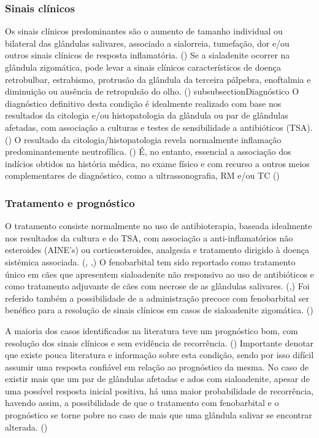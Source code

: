 \subsubsection{Sinais clínicos}
Os sinais clínicos predominantes são o aumento de tamanho individual ou bilateral das glândulas salivares, associado a sialorreia, tumefação, dor e/ou outros sinais clínicos de resposta inflamatória. (\cite{McGill2009}) Se a sialadenite ocorrer na glândula zigomática, pode levar a sinais clínicos característicos de doença retrobulbar, estrabismo, protrusão da glândula da terceira pálpebra, enoftalmia e diminuição ou ausência de retropulsão do olho. (\cite{11cases})
subsubsection{Diagnóstico}
O diagnóstico definitivo desta condição é idealmente realizado com base nos resultados da citologia e/ou histopatologia da glândula ou par de glândulas afetadas, com associação a culturas e testes de sensibilidade a antibióticos (TSA). (\cite{Enache2025}) O resultado da citologia/histopatologia   revela normalmente inflamação predominantemente neutrofílica. (\cite{Enache2025}) É, no entanto, essencial a associação dos indícios obtidos na história médica, no exame físico e com recurso a outros meios complementares de diagnóstico, como a ultrassonografia, RM e/ou TC  (\cite{Enache2025})

\subsubsection{Tratamento e prognóstico}

O tratamento consiste normalmente no uso de antibioterapia, baseada idealmente nos resultados da cultura e do TSA, com associação a anti-inflamatórios não esteroides (AINE’s) ou corticosteroides, analgesia e tratamento dirigido à doença sistémica associada. (\cite{Park2022}, \cite{Enache2025},\cite{sialadenite}) O fenobarbital tem sido reportado como tratamento único em cães que apresentem sialoadenite não responsivo ao uso de antibióticos e como tratamento adjuvante de cães com necrose de as glândulas salivares. (\cite{Park2022},\cite{Enache2025}) Foi referido também a possibilidade de a administração precoce com fenobarbital ser benéfico para a resolução de sinais clínicos em casos de sialoadenite zigomática. (\cite{Martinez2018})


A maioria dos casos identificados na literatura teve um prognóstico bom, com resolução dos sinais clínicos e sem evidência de recorrência. (\cite{sialadenite}) Importante denotar que existe pouca literatura e informação sobre esta condição, sendo por isso difícil assumir uma resposta confiável em relação ao prognóstico da mesma.   
No caso de existir mais que um par de glândulas afetadas e \cite{Kumar2017}ados com sialoadenite, apesar de uma possível resposta inicial positiva, há uma maior probabilidade de recorrência, havendo assim, a possibilidade de que o tratamento com fenobarbital e o prognóstico se torne pobre no caso de mais que uma glândula salivar se encontrar alterada. (\cite{Park2022})


